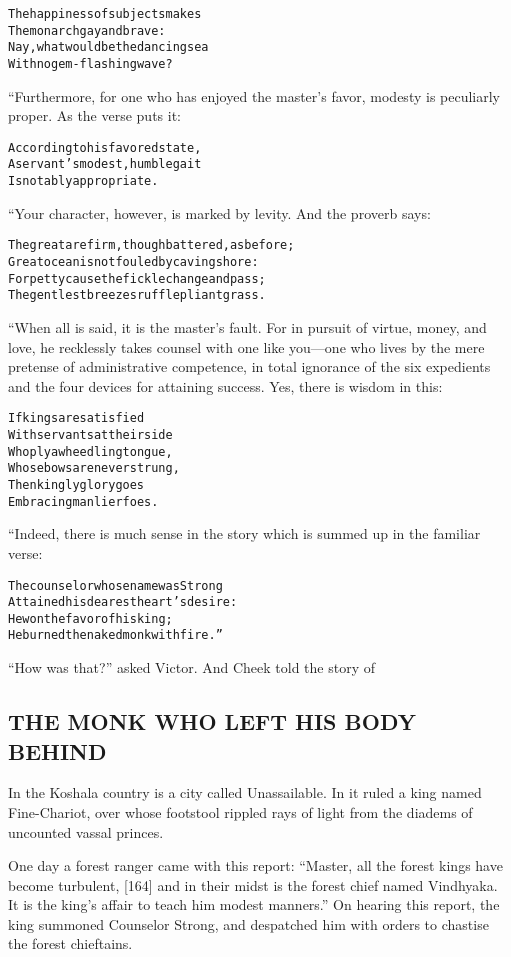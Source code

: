\documentclass{article}
\renewenvironment{verbatim}{\begin{alltt}\normalfont\begin{centering}}{\end{centering}\end{alltt}}
\begin{document}
\begin{verbatim}
The happiness of subjects makes
    The monarch gay and brave:
Nay, what would be the dancing sea
    With no gem-flashing wave?
\end{verbatim}
“Furthermore, for one who has enjoyed the master's favor, modesty
is peculiarly proper. As the verse puts it:

\begin{verbatim}
According to his favored state,
A servant's modest, humble gait
Is notably appropriate.
\end{verbatim}
“Your character, however, is marked by levity. And the proverb
says:

\begin{verbatim}
The great are firm, though battered, as before;
Great ocean is not fouled by caving shore:
For petty cause the fickle change and pass;
The gentlest breezes ruffle pliant grass.
\end{verbatim}
“When all is said, it is the master's fault. For in pursuit of
virtue, money, and love, he recklessly takes counsel with one like
you---one who lives by the mere pretense of administrative
competence, in total ignorance of the six expedients and the four
devices for attaining success. Yes, there is wisdom in this:

\begin{verbatim}
If kings are satisfied
With servants at their side
Who ply a wheedling tongue,
Whose bows are never strung,
Then kingly glory goes
Embracing manlier foes.
\end{verbatim}
“Indeed, there is much sense in the story which is summed up in the
familiar verse:

\begin{verbatim}
The counselor whose name was Strong
    Attained his dearest heart's desire:
He won the favor of his king;
    He burned the naked monk with fire.”
\end{verbatim}
``How was that?'' asked Victor. And Cheek told the story of

\subsection{THE MONK WHO LEFT HIS BODY BEHIND}

In the Koshala country is a city called Unassailable. In it ruled a
king named Fine-Chariot, over whose footstool rippled rays of light
from the diadems of uncounted vassal princes.

One day a forest ranger came with this report:
``Master, all the forest kings have become turbulent, [164] and in their midst is the forest chief named Vindhyaka. It is the king's affair to teach him modest manners.''
On hearing this report, the king summoned Counselor Strong, and
despatched him with orders to chastise the forest chieftains.
\end{document}
